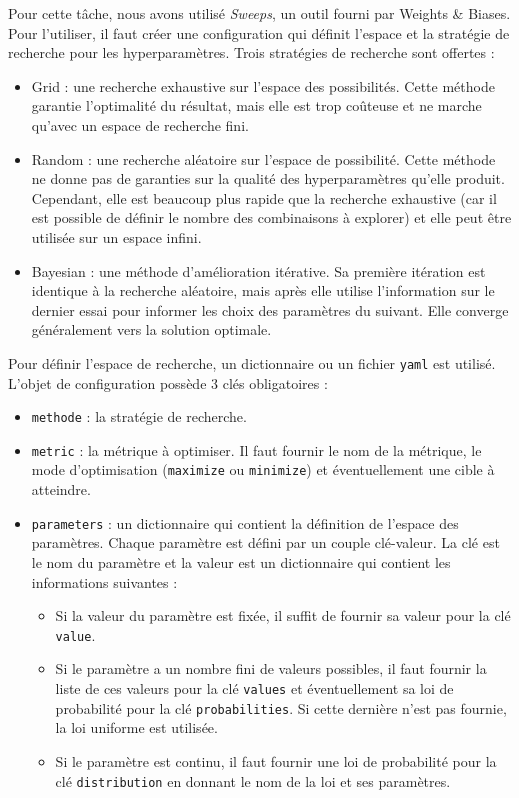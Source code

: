 Pour cette tâche, nous avons utilisé \emph{\foreignlanguage{english}{Sweeps}},
un outil fourni par \foreignlanguage{english}{Weights \& Biases}.
Pour l'utiliser, il faut créer une configuration qui définit l'espace et la stratégie de recherche pour les hyperparamètres.
Trois stratégies de recherche sont offertes :

\begin{itemize}
    \item \foreignlanguage{english}{Grid} : une recherche exhaustive sur l'espace des possibilités.
    Cette méthode garantie l'optimalité du résultat, mais elle est trop coûteuse 
    et ne marche qu'avec un espace de recherche fini.
    \item \foreignlanguage{english}{Random} : une recherche aléatoire sur l'espace de possibilité.
    Cette méthode ne donne pas de garanties sur la qualité des hyperparamètres qu'elle produit.
    Cependant, elle est beaucoup plus rapide que la recherche exhaustive 
    (car il est possible de définir le nombre des combinaisons à explorer)
    et elle peut être utilisée sur un espace infini.
    \item \foreignlanguage{english}{Bayesian} : une méthode d'amélioration itérative.
    Sa première itération est identique à la recherche aléatoire,
    mais après elle utilise l'information sur le dernier essai pour informer les choix des paramètres du suivant.
    Elle converge généralement vers la solution optimale.
\end{itemize}

Pour définir l'espace de recherche, un dictionnaire ou un fichier \verb|yaml| est utilisé.
L'objet de configuration possède 3 clés obligatoires :

\begin{itemize}
    \item \verb|methode| : la stratégie de recherche.
    \item \verb|metric| : la métrique à optimiser. Il faut fournir le nom de la métrique, le mode d'optimisation
    (\verb|maximize| ou \verb|minimize|) et éventuellement une cible à atteindre.
    \item \verb|parameters| : un dictionnaire qui contient la définition de l'espace des paramètres.
    Chaque paramètre est défini par un couple clé-valeur.
    La clé est le nom du paramètre et la valeur est un dictionnaire qui contient les informations suivantes :
    \begin{itemize}
        \item Si la valeur du paramètre est fixée, il suffit de fournir sa valeur pour la clé \verb|value|.
        \item Si le paramètre a un nombre fini de valeurs possibles, il faut fournir la liste de ces valeurs
        pour la clé \verb|values| et éventuellement sa loi de probabilité pour la clé \verb|probabilities|.
        Si cette dernière n'est pas fournie, la loi uniforme est utilisée.
        \item Si le paramètre est continu, il faut fournir une loi de probabilité pour la clé \verb|distribution|
        en donnant le nom de la loi et ses paramètres.
    \end{itemize}
\end{itemize}

